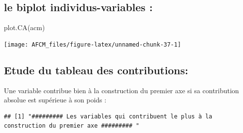 \documentclass[
]{article}
\newenvironment{Shaded}{\begin{snugshade}}{\end{snugshade}}
\newcommand{\FunctionTok}[1]{\textcolor[rgb]{0.00,0.00,0.00}{#1}}
\newcommand{\NormalTok}[1]{#1}
\newcommand{\OtherTok}[1]{\textcolor[rgb]{0.56,0.35,0.01}{#1}}
\newcommand{\SpecialCharTok}[1]{\textcolor[rgb]{0.00,0.00,0.00}{#1}}
\newcommand{\StringTok}[1]{\textcolor[rgb]{0.31,0.60,0.02}{#1}}
\begin{document}
\hypertarget{le-biplot-individus-variables}{%
\subsection{le biplot individus-variables
:}\label{le-biplot-individus-variables}}

\begin{Shaded}
\begin{Highlighting}[]
\FunctionTok{plot.CA}\NormalTok{(acm)}
\end{Highlighting}
\end{Shaded}

\texttt{[image: AFCM\_files/figure-latex/unnamed-chunk-37-1]}

\hypertarget{etude-du-tableau-des-contributions}{%
\subsection{Etude du tableau des
contributions:}\label{etude-du-tableau-des-contributions}}

Une variable contribue bien à la construction du premier axe si sa
contribution absolue est supérieue à son poids :

\begin{Shaded}
\end{Shaded}

\begin{verbatim}
## [1] "######### Les variables qui contribuent le plus à la construction du premier axe ######### "
\end{verbatim}
\end{document}
